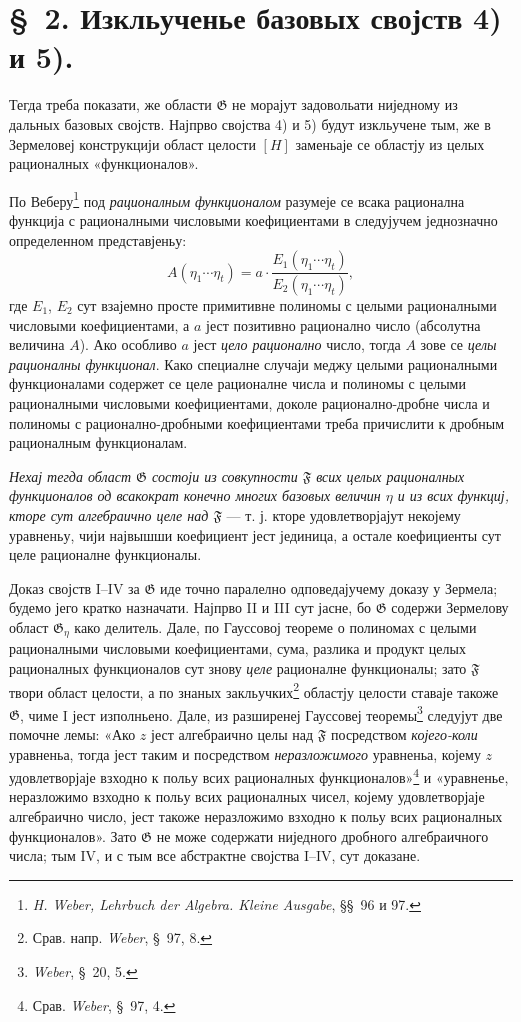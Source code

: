 \documentclass[11pt]{article}
\begin{document}
\section*{\S\ 2. Изкльученье базовых својств 4) и 5).}

Тегда треба показати, же области $\mathfrak G$ не морајут задовольати ниједному из дальных базовых својств. Најпрво својства 4) и 5) будут изкльучене тым, же в Зермеловеј конструкцији област целости $[H]$ заменьаје се областју из целых рационалных «функционалов».

По Веберу\footnote{\emph{H. Weber, Lehrbuch der Algebra. Kleine Ausgabe}, \S\S\ 96 и 97.} под {\itshape рационалным функционалом} разумеје се всака рационална функција с рационалными числовыми коефициентами в следујучем једнозначно определенном представјеньу:
\[
 A(\eta_1\cdots \eta_t)
   = a\cdot\frac{E_1(\eta_1\cdots \eta_t)}{E_2(\eta_1\cdots \eta_t)},
\]
где $E_1$, $E_2$ сут взајемно просте примитивне полиномы с целыми рационалными числовыми коефициентами, а $a$ јест позитивно рационално число (абсолутна величина $A$). Ако особливо $a$ јест {\itshape цело рационално} число, тогда $A$ зове се {\itshape целы рационалны функционал}. Како специалне случаји меджу целыми рационалными функционалами содержет се целе рационалне числа и полиномы с целыми рационалными числовыми коефициентами, доколе рационално-дробне числа и полиномы с рационално-дробными коефициентами треба причислити к дробным рационалным функционалам.

{\itshape Нехај тегда област $\mathfrak G$ состоји из совкупности $\mathfrak F$ всих целых рационалных функционалов од всакократ конечно многих базовых величин $\eta$ и из всих функциј, кторе сут алгебраично целе над $\mathfrak F$} --- т. ј. кторе удовлетворјајут некојему уравненьу, чији највышши коефициент јест јединица, а остале коефициенты сут целе рационалне функционалы.

Доказ својств I--IV за $\mathfrak G$ иде точно паралелно одповедајучему доказу у Зермела; будемо јего кратко назначати. Најпрво II и III сут јасне, бо $\mathfrak G$ содержи Зермелову област $\mathfrak G_\eta$ како делитель. Дале, по Гауссовој теореме о полиномах с целыми рационалными числовыми коефициентами, сума, разлика и продукт целых рационалных функционалов сут знову {\itshape целе} рационалне функционалы; зато $\mathfrak F$ твори област целости, а по знаных закльучких\footnote{Срав. напр. \emph{Weber}, \S\ 97, 8.} областју целости ставаје такоже $\mathfrak G$, чиме I јест изполньено. Дале, из разширенеј Гауссовеј теоремы\footnote{\emph{Weber}, \S\ 20, 5.} следујут две помочне лемы: «Ако $z$ јест алгебраично целы над $\mathfrak F$ посредством {\itshape којего-коли} уравненьа, тогда јест таким и посредством {\itshape неразложимого} уравненьа, којему $z$ удовлетворјаје взходно к польу всих рационалных функционалов»\footnote{Срав. \emph{Weber}, \S\ 97, 4.} и «уравненье, неразложимо взходно к польу всих рационалных чисел, којему удовлетворјаје алгебраично число, јест такоже неразложимо взходно к польу всих рационалных функционалов». Зато $\mathfrak G$ не може содержати ниједного дробного алгебраичного числа; тым IV, и с тым все абстрактне својства I--IV, сут доказане.
\end{document}
